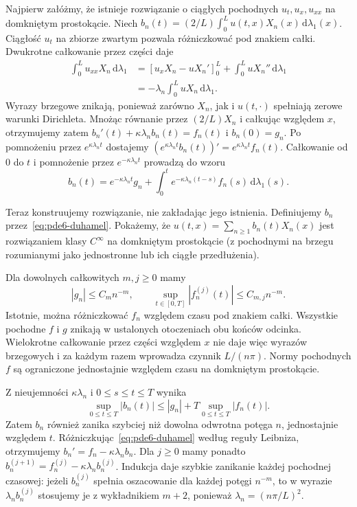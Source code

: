 Najpierw załóżmy, że istnieje rozwiązanie o ciągłych
pochodnych $u_t,u_x,u_{xx}$ na domkniętym prostokącie.
Niech
$b_n(t)=(2/L)\int_0^L u(t,x)X_n(x)\,\mathrm d\lambda_1(x)$.
Ciągłość $u_t$ na zbiorze zwartym pozwala różniczkować
pod znakiem całki. Dwukrotne całkowanie przez części daje
\[
 \begin{aligned}
 \int_0^L u_{xx}X_n\,\mathrm d\lambda_1
 &=[u_xX_n-uX_n']_0^L
   +\int_0^L u X_n''\,\mathrm d\lambda_1\\
 &=-\lambda_n\int_0^L u X_n\,\mathrm d\lambda_1 .
 \end{aligned}
\]
Wyrazy brzegowe znikają, ponieważ zarówno $X_n$,
jak i $u(t,\cdot)$ spełniają zerowe warunki Dirichleta.
Mnożąc równanie przez $(2/L)X_n$ i całkując względem $x$,
otrzymujemy zatem
$b_n'(t)+\kappa\lambda_nb_n(t)=f_n(t)$ i $b_n(0)=g_n$.
Po pomnożeniu przez $e^{\kappa\lambda_nt}$ dostajemy
$(e^{\kappa\lambda_nt}b_n(t))'=e^{\kappa\lambda_nt}f_n(t)$.
Całkowanie od $0$ do $t$ i pomnożenie przez
$e^{-\kappa\lambda_nt}$ prowadzą do wzoru
\begin{equation}\label{eq:pde6-duhamel}
 b_n(t)=e^{-\kappa\lambda_nt}g_n
 +\int_0^t e^{-\kappa\lambda_n(t-s)}f_n(s)
 \,\mathrm d\lambda_1(s).
\end{equation}

Teraz konstruujemy rozwiązanie, nie zakładając jego
istnienia. Definiujemy $b_n$ przez~\eqref{eq:pde6-duhamel}.
Pokażemy, że
$u(t,x)=\sum_{n\ge1}b_n(t)X_n(x)$
jest rozwiązaniem klasy $C^\infty$ na domkniętym
prostokącie (z pochodnymi na brzegu rozumianymi
jako jednostronne lub ich ciągłe przedłużenia).

Dla dowolnych całkowitych $m,j\ge0$ mamy
\[
 |g_n|\le C_m n^{-m},\qquad
 \sup_{t\in[0,T]}|f_n^{(j)}(t)|\le C_{m,j}n^{-m}.
\]
Istotnie, można różniczkować $f_n$ względem czasu
pod znakiem całki. Wszystkie pochodne $f$ i $g$
znikają w ustalonych otoczeniach obu końców odcinka.
Wielokrotne całkowanie przez części względem $x$
nie daje więc wyrazów brzegowych i za każdym razem
wprowadza czynnik $L/(n\pi)$. Normy pochodnych $f$
są ograniczone jednostajnie względem czasu na
domkniętym prostokącie.

Z nieujemności $\kappa\lambda_n$ i $0\le s\le t\le T$
wynika
\[
 \sup_{0\le t\le T}|b_n(t)|
 \le |g_n|+T\sup_{0\le t\le T}|f_n(t)|.
\]
Zatem $b_n$ również zanika szybciej niż dowolna
odwrotna potęga $n$, jednostajnie względem $t$.
Różniczkując~\eqref{eq:pde6-duhamel} według reguły
Leibniza, otrzymujemy $b_n'=f_n-\kappa\lambda_nb_n$.
Dla $j\ge0$ mamy ponadto
$b_n^{(j+1)}=f_n^{(j)}-\kappa\lambda_nb_n^{(j)}$.
Indukcja daje szybkie zanikanie każdej pochodnej
czasowej: jeżeli $b_n^{(j)}$ spełnia oszacowanie
dla każdej potęgi $n^{-m}$, to w wyrazie
$\lambda_nb_n^{(j)}$ stosujemy je z wykładnikiem $m+2$,
ponieważ $\lambda_n=(n\pi/L)^2$.

